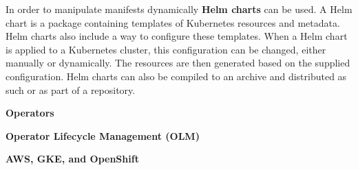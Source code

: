 In order to manipulate manifests dynamically \textbf{Helm charts}\cite{helm-charts} can be used.
A Helm chart is a package containing templates of Kubernetes resources and metadata.
Helm charts also include a way to configure these templates.
When a Helm chart is applied to a Kubernetes cluster, this configuration can be changed, either manually or dynamically.
The resources are then generated based on the supplied configuration.
Helm charts can also be compiled to an archive and distributed as such or as part of a repository.

\textbf{Operators}

\textbf{Operator Lifecycle Management (OLM)}

\textbf{AWS, GKE, and OpenShift}